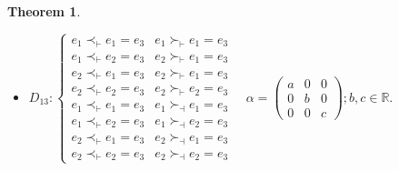 \documentclass[11pt,twoside,reqno]{amsart}
\theoremstyle{plain}
\newtheorem{thm}{Theorem}[section]
\theoremstyle{definition}
\begin{document}
\begin{thm}
\begin{itemize}
\item
$D_{13}:\left\{
    \begin{array}{llllll}
      e_1\prec_\vdash e_1=e_3& e_1\succ_\vdash e_1=e_3\\
			e_1\prec_\vdash  e_2=e_3& e_2\succ_\vdash e_1=e_3\\
			e_2\prec_\vdash e_1=e_3& e_2\succ_\vdash e_1=e_3\\
			e_2\prec_\vdash e_2=e_3& e_2\succ_\vdash e_2=e_3\\
     e_1\prec_\vdash e_1=e_3& e_1\succ_\dashv e_1=e_3\\
		 e_1\prec_\vdash e_2=e_3& e_1\succ_\dashv e_2=e_3\\
		 e_2\prec_\vdash e_1=e_3& e_2\succ_\dashv e_1=e_3\\
		 e_2\prec_\vdash e_2=e_3& e_2\succ_\dashv e_2=e_3
    \end{array}
\right.\quad
\alpha = 
\begin{pmatrix}
a& 0 &0\\
0 &b &0 \\
0 &0 &c 
\end{pmatrix};  b , c\in\mathbb{R}.
$
\end{itemize}
\end{thm}
\end{document}
